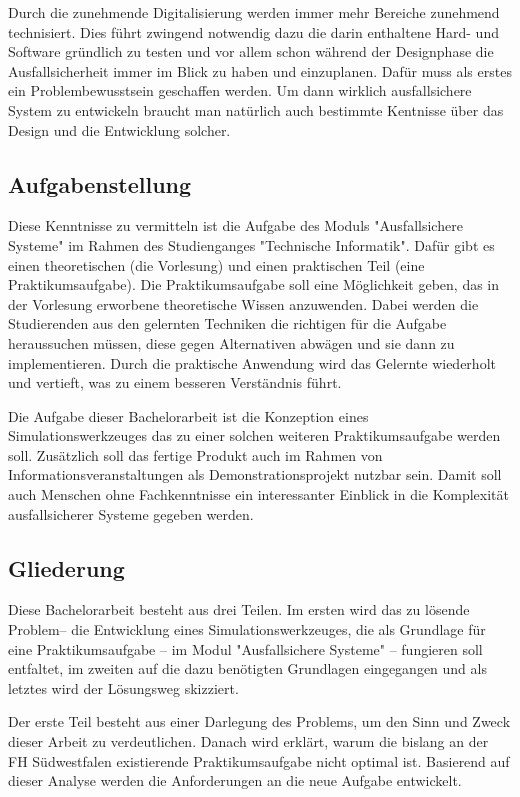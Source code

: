 Durch die zunehmende Digitalisierung werden immer mehr Bereiche zunehmend technisiert. Dies f{\"{u}}hrt zwingend notwendig
dazu die darin enthaltene Hard- und Software gr{\"{u}}ndlich zu  testen und vor allem schon w{\"{a}}hrend der Designphase
die Ausfallsicherheit immer im Blick zu haben und einzuplanen. Daf{\"{u}}r muss als erstes ein Problembewusstsein geschaffen
werden. Um dann wirklich ausfallsichere System zu entwickeln braucht man nat{\"{u}}rlich auch bestimmte Kentnisse 
{\"{u}}ber das Design und die Entwicklung solcher.

\subsection{Aufgabenstellung} 
Diese Kenntnisse zu vermitteln ist die Aufgabe des Moduls "Ausfallsichere Systeme" im Rahmen des Studienganges 
"Technische Informatik". Daf{\"{u}}r gibt es einen theoretischen (die Vorlesung) und einen praktischen Teil (eine 
Praktikumsaufgabe). Die Praktikumsaufgabe soll eine M{\"{o}}glichkeit geben, das in der Vorlesung erworbene 
theoretische Wissen anzuwenden. Dabei werden die Studierenden aus den gelernten Techniken die richtigen 
f{\"{u}}r die Aufgabe heraussuchen m{\"{u}}ssen, diese gegen Alternativen abw{\"{a}}gen und sie dann zu 
implementieren. Durch die  praktische Anwendung wird das Gelernte wiederholt und vertieft, was zu einem besseren 
Verst{\"{a}}ndnis f{\"{u}}hrt. 

Die Aufgabe dieser Bachelorarbeit ist die Konzeption eines Simulationswerkzeuges das zu einer solchen weiteren
Praktikumsaufgabe werden soll. 
Zus{\"{a}}tzlich soll das fertige Produkt auch im Rahmen von Informationsveranstaltungen als Demonstrationsprojekt 
nutzbar sein. Damit soll auch Menschen ohne Fachkenntnisse ein interessanter Einblick in die 
Komplexit{\"{a}}t ausfallsicherer Systeme gegeben werden.

\subsection{Gliederung}
Diese Bachelorarbeit besteht aus drei Teilen. Im ersten wird das zu l{\"{o}}sende Problem-- die Entwicklung eines
Simulationswerkzeuges, die als Grundlage f{\"{u}}r eine Praktikumsaufgabe -- im Modul "Ausfallsichere Systeme" --
fungieren soll entfaltet, im zweiten auf die dazu ben{\"{o}}tigten Grundlagen eingegangen und als letztes wird der
L{\"{o}}sungsweg skizziert. 

Der erste Teil besteht aus einer Darlegung des Problems, um den Sinn und Zweck dieser Arbeit zu verdeutlichen. 
Danach wird erkl{\"{a}}rt, warum die bislang an der FH S{\"{u}}dwestfalen existierende Praktikumsaufgabe nicht optimal ist.
Basierend auf dieser Analyse werden die Anforderungen an die neue Aufgabe entwickelt. 


